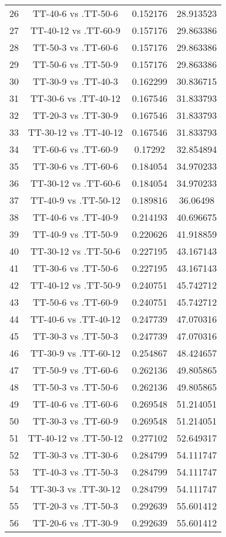 \documentclass[a4paper,10pt]{article}
\begin{document}
\begin{landscape}
\begin{table}[!htp]
\begin{tabular}{cccc}
26&TT-40-6 vs .TT-50-6&0.152176&28.913523\\
27&TT-40-12 vs .TT-60-9&0.157176&29.863386\\
28&TT-50-3 vs .TT-60-6&0.157176&29.863386\\
29&TT-50-6 vs .TT-50-9&0.157176&29.863386\\
30&TT-30-9 vs .TT-40-3&0.162299&30.836715\\
31&TT-30-6 vs .TT-40-12&0.167546&31.833793\\
32&TT-20-3 vs .TT-30-9&0.167546&31.833793\\
33&TT-30-12 vs .TT-40-12&0.167546&31.833793\\
34&TT-60-6 vs .TT-60-9&0.17292&32.854894\\
35&TT-30-6 vs .TT-60-6&0.184054&34.970233\\
36&TT-30-12 vs .TT-60-6&0.184054&34.970233\\
37&TT-40-9 vs .TT-50-12&0.189816&36.06498\\
38&TT-40-6 vs .TT-40-9&0.214193&40.696675\\
39&TT-40-9 vs .TT-50-9&0.220626&41.918859\\
40&TT-30-12 vs .TT-50-6&0.227195&43.167143\\
41&TT-30-6 vs .TT-50-6&0.227195&43.167143\\
42&TT-40-12 vs .TT-50-9&0.240751&45.742712\\
43&TT-50-6 vs .TT-60-9&0.240751&45.742712\\
44&TT-40-6 vs .TT-40-12&0.247739&47.070316\\
45&TT-30-3 vs .TT-50-3&0.247739&47.070316\\
46&TT-30-9 vs .TT-60-12&0.254867&48.424657\\
47&TT-50-9 vs .TT-60-6&0.262136&49.805865\\
48&TT-50-3 vs .TT-50-6&0.262136&49.805865\\
49&TT-40-6 vs .TT-60-6&0.269548&51.214051\\
50&TT-30-3 vs .TT-60-9&0.269548&51.214051\\
51&TT-40-12 vs .TT-50-12&0.277102&52.649317\\
52&TT-30-3 vs .TT-30-6&0.284799&54.111747\\
53&TT-40-3 vs .TT-50-3&0.284799&54.111747\\
54&TT-30-3 vs .TT-30-12&0.284799&54.111747\\
55&TT-20-3 vs .TT-50-3&0.292639&55.601412\\
56&TT-20-6 vs .TT-30-9&0.292639&55.601412\\

\end{tabular}
\end{table}
\end{landscape}
\end{document}
